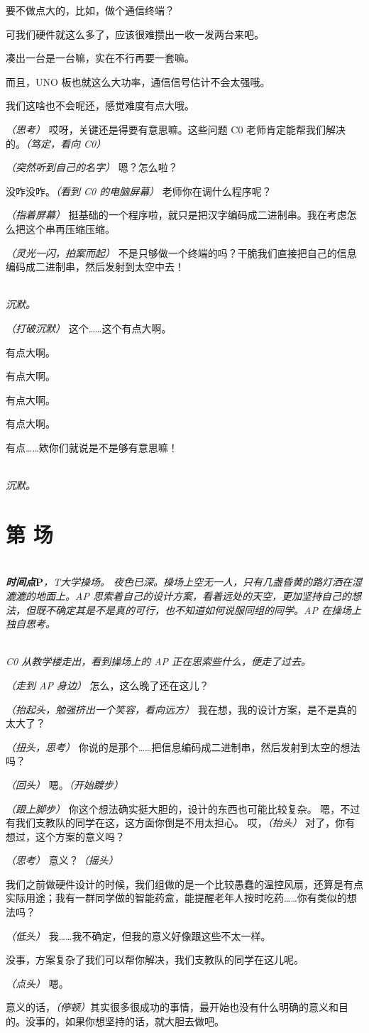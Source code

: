 \documentclass[10pt, a5paper, oneside]{memoir}
\newcommand{\stage}[1]{%
	\\[0.4\baselineskip] \textit{#1}%
}
\newcommand{\dialog}[2][旁白]{%
	\item[#1] #2%
}
\newcommand*{\direction}[1]{\textit{（#1）}}
\newcounter{scene}
\newcommand{\scene}[2][]{
	\stepcounter{scene}
	\section*{第 \thescene 场\; #1}
	\addcontentsline{toc}{section}{SCENE \thescene\quad #1}
	\begin{description}[align=left, itemsep=1ex, leftmargin=2em, itemindent=-1em, labelsep=1em]
		\item[] \hfill 
		#2
	\end{description}
	\vskip 1cm
}
\begin{document}
{{{		}
		\dialog[D1]{
			要不做点大的，比如，做个通信终端？
		}
		\dialog[D0]{
			可我们硬件就这么多了，应该很难攒出一收一发两台来吧。
		}
		\dialog[D3]{
			凑出一台是一台嘛，实在不行再要一套嘛。
		}
		\dialog[D4]{
			而且，UNO 板也就这么大功率，通信信号估计不会太强哦。
		}
		\dialog[D2]{
			我们这啥也不会呢还，感觉难度有点大哦。
		}
		\dialog[AP]{
			\direction{思考} 哎呀，关键还是得要有意思嘛。这些问题 C0 老师肯定能帮我们解决的。\direction{笃定，看向 C0}
		}
		\dialog[C0]{
			\direction{突然听到自己的名字} 嗯？怎么啦？
		}
		\dialog[D0]{
			没咋没咋。\direction{看到 C0 的电脑屏幕} 老师你在调什么程序呢？
		}
		\dialog[C0]{
			\direction{指着屏幕} 挺基础的一个程序啦，就只是把汉字编码成二进制串。我在考虑怎么把这个串再压缩压缩。
		}
		\dialog[AP]{
			\direction{灵光一闪，拍案而起} 不是只够做一个终端的吗？干脆我们直接把自己的信息编码成二进制串，然后发射到太空中去！
		}
		\stage{
			沉默。
		}
		\dialog[D0]{
			\direction{打破沉默} 这个……这个有点大啊。
		}
		\dialog[D1]{
			有点大啊。
		}
		\dialog[D2]{
			有点大啊。
		}
		\dialog[D3]{
			有点大啊。
		}
		\dialog[D4]{
			有点大啊。
		}
		\dialog[AP]{
			有点……欸你们就说是不是够有意思嘛！
		}
		\stage{
			沉默。
		}
	}
	\scene{
		\stage{
			\textup{
				\textbf{时间点\(\boldsymbol{P}\)}，T大学操场。
			}
			夜色已深。操场上空无一人，只有几盏昏黄的路灯洒在湿漉漉的地面上。AP 思索着自己的设计方案，看着远处的天空，更加坚持自己的想法，但既不确定其是不是真的可行，也不知道如何说服同组的同学。AP 在操场上独自思考。
		}
		\stage{
			C0 从教学楼走出，看到操场上的 AP 正在思索些什么，便走了过去。
		}
		\dialog[C0]{
			\direction{走到 AP 身边} 怎么，这么晚了还在这儿？
		}
		\dialog[AP]{
			\direction{抬起头，勉强挤出一个笑容，看向远方} 我在想，我的设计方案，是不是真的太大了？
		}
		\dialog[C0]{
			\direction{扭头，思考} 你说的是那个……把信息编码成二进制串，然后发射到太空的想法吗？
		}
		\dialog[AP]{ 
			\direction{回头} 嗯。\direction{开始踱步}
		}
		\dialog[C0]{
			\direction{跟上脚步} 你这个想法确实挺大胆的，设计的东西也可能比较复杂。
			嗯，不过有我们支教队的同学在这，这方面你倒是不用太担心。
			哎，\direction{抬头} 对了，你有想过，这个方案的意义吗？
		}
		\dialog[AP]{
			\direction{思考} 意义？\direction{摇头}
		}
		\dialog[C0]{
			我们之前做硬件设计的时候，我们组做的是一个比较愚蠢的温控风扇，还算是有点实际用途；我有一群同学做的智能药盒，能提醒老年人按时吃药……你有类似的想法吗？
		}
		\dialog[AP]{
			\direction{低头} 我……我不确定，但我的意义好像跟这些不太一样。
		}
		\dialog[C0]{
			没事，方案复杂了我们可以帮你解决，我们支教队的同学在这儿呢。
		}
		\dialog[AP]{
			\direction{点头} 嗯。
		}
		\dialog[C0]{
			意义的话，\direction{停顿}其实很多很成功的事情，最开始也没有什么明确的意义和目的。没事的，如果你想坚持的话，就大胆去做吧。
}}}
\end{document}

